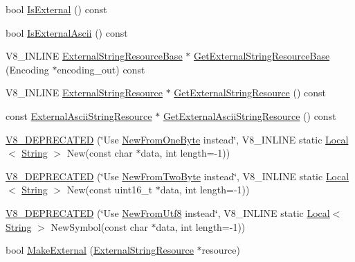 \begin{DoxyCompactItemize}
\item 
bool \hyperlink{classv8_1_1_string_abbf623aabba9446cd57af14018877398}{Is\+External} () const 
\item 
bool \hyperlink{classv8_1_1_string_a470adeefeeb419860d4e069714fed42e}{Is\+External\+Ascii} () const 
\item 
V8\+\_\+\+I\+N\+L\+I\+N\+E \hyperlink{classv8_1_1_string_1_1_external_string_resource_base}{External\+String\+Resource\+Base} $\ast$ \hyperlink{classv8_1_1_string_a471cf0e3ca135d839e59d25da66894e0}{Get\+External\+String\+Resource\+Base} (Encoding $\ast$encoding\+\_\+out) const 
\item 
V8\+\_\+\+I\+N\+L\+I\+N\+E \hyperlink{classv8_1_1_string_1_1_external_string_resource}{External\+String\+Resource} $\ast$ \hyperlink{classv8_1_1_string_a1a78c6fe39dbdd6322ca576e224f0cba}{Get\+External\+String\+Resource} () const 
\item 
const \hyperlink{classv8_1_1_string_1_1_external_ascii_string_resource}{External\+Ascii\+String\+Resource} $\ast$ \hyperlink{classv8_1_1_string_a1e6b2d33868b12e3b8fc4553b8b11d24}{Get\+External\+Ascii\+String\+Resource} () const 
\item 
\hyperlink{classv8_1_1_string_a202ad2950f370b4b5cf3350674681f66}{V8\+\_\+\+D\+E\+P\+R\+E\+C\+A\+T\+E\+D} (\char`\"{}Use \hyperlink{classv8_1_1_string_afa8026ed1337564a9fd15dc56aceaa83}{New\+From\+One\+Byte} instead\char`\"{}, V8\+\_\+\+I\+N\+L\+I\+N\+E static \hyperlink{classv8_1_1_local}{Local}$<$ \hyperlink{classv8_1_1_string}{String} $>$ New(const char $\ast$data, int length=-\/1))
\item 
\hyperlink{classv8_1_1_string_a3733aa1d9516b6e5025cd1aa5c020e83}{V8\+\_\+\+D\+E\+P\+R\+E\+C\+A\+T\+E\+D} (\char`\"{}Use \hyperlink{classv8_1_1_string_a876615eb027092a6a71a4e7d69b82d00}{New\+From\+Two\+Byte} instead\char`\"{}, V8\+\_\+\+I\+N\+L\+I\+N\+E static \hyperlink{classv8_1_1_local}{Local}$<$ \hyperlink{classv8_1_1_string}{String} $>$ New(const uint16\+\_\+t $\ast$data, int length=-\/1))
\item 
\hyperlink{classv8_1_1_string_aa9e95021342e94e34e7fa4f726c3879b}{V8\+\_\+\+D\+E\+P\+R\+E\+C\+A\+T\+E\+D} (\char`\"{}Use \hyperlink{classv8_1_1_string_aa4b8c052f5108ca6350c45922602b9d4}{New\+From\+Utf8} instead\char`\"{}, V8\+\_\+\+I\+N\+L\+I\+N\+E static \hyperlink{classv8_1_1_local}{Local}$<$ \hyperlink{classv8_1_1_string}{String} $>$ New\+Symbol(const char $\ast$data, int length=-\/1))
\item 
bool \hyperlink{classv8_1_1_string_a5efd1eba40c1fa8a6aae2c4a175a63be}{Make\+External} (\hyperlink{classv8_1_1_string_1_1_external_string_resource}{External\+String\+Resource} $\ast$resource)

\end{DoxyCompactItemize}
